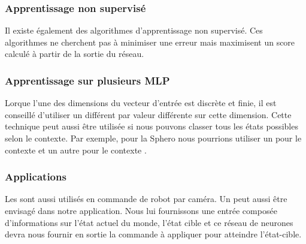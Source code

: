 \subsubsection{Apprentissage non supervisé}
Il existe également des algorithmes d'apprentissage non supervisé.
Ces algorithmes ne cherchent pas à minimiser une erreur mais maximisent un score calculé à partir de la sortie du réseau.
\subsubsection{Apprentissage sur plusieurs MLP}
Lorque l'une des dimensions du vecteur d'entrée est discrète et finie, il est conseillé d'utiliser un \mlp différent par valeur différente sur cette dimension.\cite{Gauthier}
Cette technique peut aussi être utilisée si nous pouvons classer tous les états possibles selon le contexte.
Par exemple, pour la Sphero nous pourrions utiliser un \mlp pour le contexte  et un autre \mlp pour le contexte .
\subsubsection{Applications}
Les \mlp sont aussi utilisés en commande de robot par caméra.\cite{Pomerleau}
Un \mlp peut aussi être envisagé dans notre application.
Nous lui fournissons une entrée composée d'informations sur l'état actuel du monde, l'état cible et ce réseau de neurones devra nous fournir en sortie la commande à appliquer pour atteindre l'état-cible.
